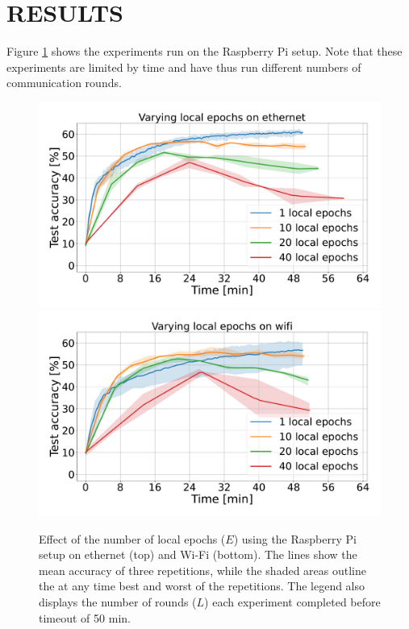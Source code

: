 \documentclass{article}
\begin{document}
\section{RESULTS}%
\label{sec:results}
Figure \ref{fig:rpi-local-epochs} shows the experiments run on the Raspberry Pi setup.
Note that these experiments are limited by time and have thus run different numbers of communication rounds.
\begin{figure}[htb!]
    \centering
    \includegraphics[width=\linewidth]{imgs/time_avg_local_epochs_ethernet.pdf}
    \includegraphics[width=\linewidth]{imgs/time_avg_local_epochs_wifi.pdf}
    \caption{Effect of the number of local epochs ($E$) using the Raspberry Pi setup on ethernet (top) and Wi-Fi (bottom).
    The lines show the mean accuracy of three repetitions, while the shaded areas outline the at any time best and worst of the repetitions.
    The legend also displays the number of rounds ($L$) each experiment completed before timeout of 50 min.
}
    \label{fig:rpi-local-epochs}
\end{figure}\noindent
\end{document}
